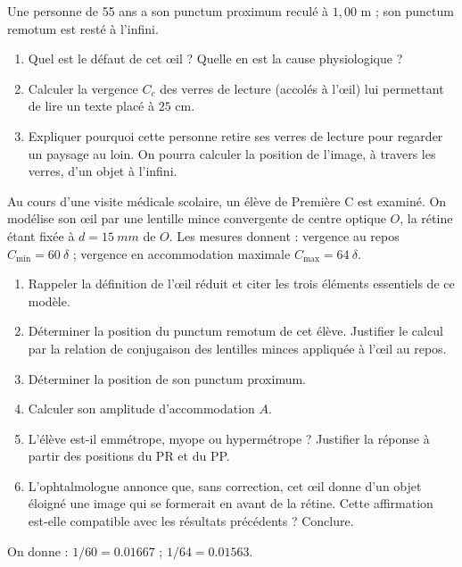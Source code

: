 \documentclass[11pt]{article}
\newcounter{popsec}
\newcounter{popsub}
\newcommand{\courssub}[1]{%
  \stepcounter{popsub}%
  \par\vspace{9pt}\noindent{\popxbold\fontsize{11.5}{13}\selectfont\color{popink}{\color{poporange}\thepopsec.\thepopsub}\hspace{6pt}#1}\par\nopagebreak\vspace{4pt}
}
\begin{document}
\begin{exercice}
Une personne de 55 ans a son punctum proximum reculé à $1{,}00$ m ; son punctum remotum est resté à l'infini.
\begin{enumerate}
\item Quel est le défaut de cet œil ? Quelle en est la cause physiologique ?
\item Calculer la vergence $C_c$ des verres de lecture (accolés à l'œil) lui permettant de lire un texte placé à $25$ cm.
\item Expliquer pourquoi cette personne retire ses verres de lecture pour regarder un paysage au loin. On pourra calculer la position de l'image, à travers les verres, d'un objet à l'infini.
\end{enumerate}
\end{exercice}

\courssub{Je me prépare au Probatoire}

\begin{exercice}
Au cours d'une visite médicale scolaire, un élève de Première C est examiné. On modélise son œil par une lentille mince convergente de centre optique $O$, la rétine étant fixée à $d = \SI{15}{mm}$ de $O$. Les mesures donnent : vergence au repos $C_{\min} = 60\ \delta$ ; vergence en accommodation maximale $C_{\max} = 64\ \delta$.
\begin{enumerate}
\item Rappeler la définition de l'œil réduit et citer les trois éléments essentiels de ce modèle.
\item Déterminer la position du punctum remotum de cet élève. Justifier le calcul par la relation de conjugaison des lentilles minces appliquée à l'œil au repos.
\item Déterminer la position de son punctum proximum.
\item Calculer son amplitude d'accommodation $A$.
\item L'élève est-il emmétrope, myope ou hypermétrope ? Justifier la réponse à partir des positions du PR et du PP.
\item L'ophtalmologue annonce que, sans correction, cet œil donne d'un objet éloigné une image qui se formerait en avant de la rétine. Cette affirmation est-elle compatible avec les résultats précédents ? Conclure.
\end{enumerate}
On donne : $1/60 = \num{0,01667}$ ; $1/64 = \num{0,01563}$.
\end{exercice}
\end{document}
